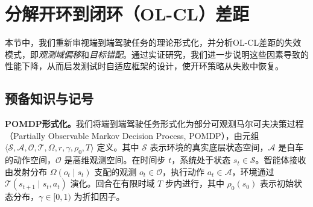 \documentclass{article}
\begin{document}
\section{分解开环到闭环（OL-CL）差距}
\label{section:decomposition_analysis}
本节中，我们重新审视端到端驾驶任务的理论形式化，并分析OL-CL差距的失效模式，即\textit{观测域偏移}和\textit{目标错配}。通过实证研究，我们进一步说明这些因素导致的性能下降，从而启发测试时自适应框架的设计，使开环策略从失败中恢复。

\subsection{预备知识与记号}
\label{subsec:preliminaries}
\noindent \textbf{POMDP形式化。}我们将端到端驾驶任务形式化为部分可观测马尔可夫决策过程（Partially Observable Markov Decision Process, POMDP），由元组 $\langle \mathcal{S}, \mathcal{A}, \mathcal{O}, \mathcal{T}, \Omega, r, \gamma, \rho_0, T \rangle$ 定义。其中 $\mathcal{S}$ 表示环境的真实底层状态空间，$\mathcal{A}$ 是自车的动作空间，$\mathcal{O}$ 是高维观测空间。在时间步 $t$，系统处于状态 $s_t \in \mathcal{S}$。智能体接收由发射分布 $\Omega(o_t \mid s_t)$ 支配的观测 $o_t \in \mathcal{O}$，执行动作 $a_t \in \mathcal{A}$，环境通过 $\mathcal{T}(s_{t+1} \mid s_t, a_t)$ 演化。回合在有限时域 $T$ 步内进行，其中 $\rho_0(s_0)$ 表示初始状态分布，$\gamma \in [0, 1)$ 为折扣因子。
\end{document}
